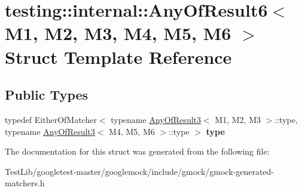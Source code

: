 \hypertarget{structtesting_1_1internal_1_1AnyOfResult6}{}\section{testing\+:\+:internal\+:\+:Any\+Of\+Result6$<$ M1, M2, M3, M4, M5, M6 $>$ Struct Template Reference}
\label{structtesting_1_1internal_1_1AnyOfResult6}
\subsection*{Public Types}
\begin{DoxyCompactItemize}
\item 
\mbox{\label{structtesting_1_1internal_1_1AnyOfResult6_a15837eb05d9ac5a76c20d344a4988dd1}} 
typedef Either\+Of\+Matcher$<$ typename \hyperlink{structtesting_1_1internal_1_1AnyOfResult3}{Any\+Of\+Result3}$<$ M1, M2, M3 $>$\+::type, typename \hyperlink{structtesting_1_1internal_1_1AnyOfResult3}{Any\+Of\+Result3}$<$ M4, M5, M6 $>$\+::type $>$ {\bfseries type}
\end{DoxyCompactItemize}


The documentation for this struct was generated from the following file\+:\begin{DoxyCompactItemize}
\item 
Test\+Lib/googletest-\/master/googlemock/include/gmock/gmock-\/generated-\/matchers.\+h\end{DoxyCompactItemize}
